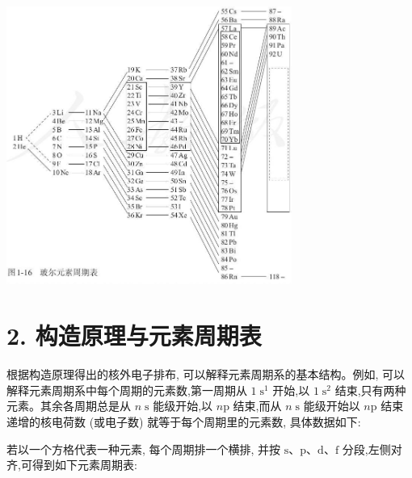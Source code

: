 \documentclass[10pt]{article}
\begin{document}
\begin{center}
\includegraphics[max width=0.7\textwidth]{images/0190e026-5a11-7df7-bd27-54d09026ba7a_22_200880.jpg}
\end{center}

\section*{2. 构造原理与元素周期表}

根据构造原理得出的核外电子排布, 可以解释元素周期系的基本结构。例如, 可以解释元素周期系中每个周期的元素数,第一周期从 \(1{\mathrm{\;s}}^{1}\) 开始,以 \(1{\mathrm{\;s}}^{2}\) 结束,只有两种元素。其余各周期总是从 \(n\mathrm{\;s}\) 能级开始,以 \(n\mathrm{p}\) 结束,而从 \(n\mathrm{\;s}\) 能级开始以 \(n\mathrm{p}\) 结束递增的核电荷数 (或电子数) 就等于每个周期里的元素数, 具体数据如下:

\begin{center}
\end{center}

若以一个方格代表一种元素, 每个周期排一个横排, 并按 \(\mathrm{s}\text{、}\mathrm{p}\text{、}\mathrm{d}\text{、}\mathrm{f}\) 分段,左侧对齐,可得到如下元素周期表:
\end{document}
